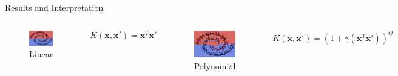\documentclass[9.5pt]{beamer}
\begin{document}
    \begin{frame}[fragile]{Results and Interpretation}
        \bigskip
        \bigskip
        \begin{columns}[onlytextwidth]
            \scriptsize
            \centering
            \begin{figure}
                \centering
                \includegraphics[width=\linewidth]{image-20220624192228376}
                \caption{Linear}
            \end{figure}
            \[K(\mathbf{x}, \mathbf{x}') = \mathbf{x}^T \mathbf{x}'\]
            \centering
            \begin{figure}
                \centering
                \includegraphics[width=\linewidth]{image-20220624192244841}
                \caption{Polynomial}
            \end{figure}
            \[K(\mathbf{x}, \mathbf{x}')=(1 + \gamma (\mathbf{x}^T\mathbf{x}'))^Q\]

\end{columns}
\end{frame}
\end{document}
